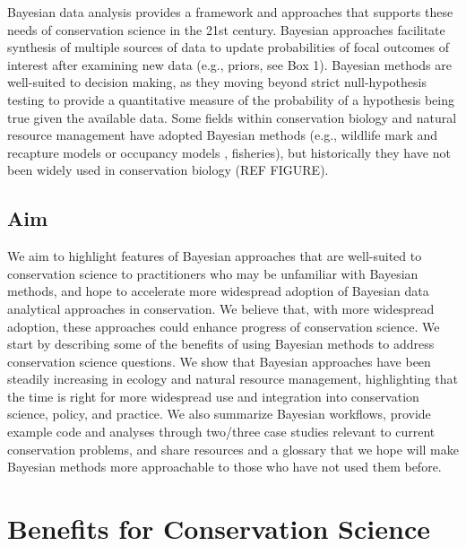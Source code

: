 \documentclass{article}
\begin{document}
\par Bayesian data analysis provides a framework and approaches that supports these needs of conservation science in the 21st century. Bayesian approaches facilitate synthesis of multiple sources of data to update probabilities of focal outcomes of interest after examining new data (e.g., priors, see Box 1). Bayesian methods are well-suited to decision making, as they moving beyond strict null-hypothesis testing to
provide a quantitative measure of the probability of a hypothesis being true given the available data. %
Some fields within conservation biology and natural resource management have adopted Bayesian methods (e.g., wildlife mark and recapture models or occupancy models \citep{Kery2011}, fisheries\citep{Doll2018}), but historically they have not been widely used in conservation biology (REF FIGURE).

\subsection*{Aim} We aim to highlight features of Bayesian approaches that are well-suited to conservation science to practitioners who may be unfamiliar with Bayesian methods, and hope to accelerate more widespread adoption of Bayesian data analytical approaches in conservation. We believe that, with more widespread adoption, these approaches could enhance progress of conservation science. We start by describing some of the benefits of using Bayesian methods to address conservation science questions. We show that Bayesian approaches have been steadily increasing in ecology and natural resource management, highlighting that the time is right for more widespread use and integration into conservation science, policy, and practice. We also summarize Bayesian workflows, provide example code and analyses through two/three case studies relevant to current conservation problems, and share resources and a glossary that we hope will make Bayesian methods more approachable to those who have not used them before.
\section* {Benefits for Conservation Science}
\end{document}
